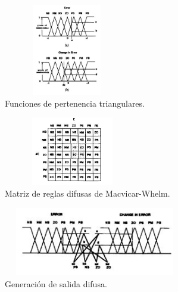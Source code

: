 \documentclass[10pt,conference]{IEEEtran}
\begin{document}
\begin{enumerate}
    \begin{figure}[H]
    \begin{center}
    \includegraphics[width=5.5cm,height=4cm]{figuras/N3.JPG}
    \caption{Funciones de pertenencia triangulares.}
    \label{N3} 
    \end{center}
    \end{figure}

    \begin{figure}[H]
    \begin{center}
    \includegraphics[width=6cm,height=3cm]{figuras/N4.JPG}
    \caption{Matriz de reglas difusas de Macvicar-Whelm.}
    \label{N4} 
    \end{center}
    \end{figure}

    \begin{figure}[H]
    \begin{center}
    \includegraphics[width=8cm,height=3cm]{figuras/N5.JPG}
    \caption{Generación de salida difusa.}
    \label{N5} 
    \end{center}
    \end{figure}


\end{enumerate}
\end{document}
